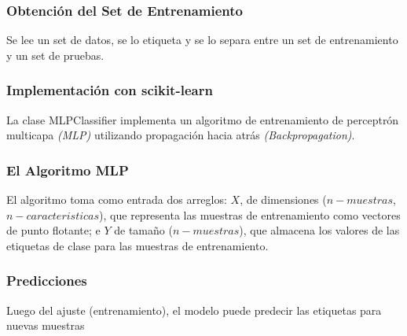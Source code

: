 \documentclass{beamer}
\begin{document}
    \begin{frame}
        \frametitle{Obtención del Set de Entrenamiento}
        \hspace*{20pt}Se lee un set de datos, se lo etiqueta y se lo separa entre un set de entrenamiento y un set de pruebas.
        \vspace*{10pt}
        

    \end{frame}   


    \begin{frame}
        \frametitle{Implementación con scikit-learn}

        \hspace*{20pt}La clase MLPClassifier implementa un algoritmo de entrenamiento de perceptrón 
        multicapa \textit{(MLP)} utilizando propagación hacia atrás \textit{(Backpropagation)}.
        \vspace*{10pt}
        



    \end{frame}

    \begin{frame}
        \frametitle{El Algoritmo MLP}
        \hspace*{20pt}El algoritmo toma como entrada dos arreglos: $X$, de dimensiones ($n-muestras$, $n-caracteristicas$), 
        que representa las muestras de entrenamiento como vectores de punto flotante; e $Y$ de tamaño ($n-muestras$), 
        que almacena los valores de las etiquetas de clase para las muestras de entrenamiento.
        \vspace*{10pt}
        


    \end{frame}

    \begin{frame}
        \frametitle{Predicciones}

        \hspace*{20pt}Luego del ajuste (entrenamiento), el modelo puede predecir las etiquetas para nuevas muestras
        \vspace*{10pt}
        

    \end{frame}
\end{document}
